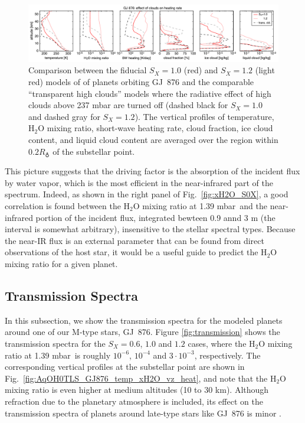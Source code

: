\documentclass[11pt,numberedappendix,twocolappendix,]{emulateapj}
\def\water{H$_2$O }
\def\preslevel{1.39 mbar\ }
\begin{document}
\begin{figure}[htb]
    \begin{center}
    \includegraphics[width=1\hsize]{fig/GJ876_heat_cld.pdf}
    \end{center}
\caption{Comparison between the fiducial $S_X=1.0$ (red) and $S_X=1.2$ (light red) models of of planets orbiting GJ~876 and the comparable ``transparent high clouds'' models where the radiative effect of high clouds above 237 mbar are turned off (dashed black for $S_X=1.0$ and dashed gray for $S_X=1.2$). The vertical profiles of temperature, \water mixing ratio, short-wave heating rate, cloud fraction, ice cloud content, and liquid cloud content are averaged over the region within $0.2R_\earth$ of the substellar point. }
\label{fig:GJ876_heat_cld}
\end{figure}

This picture suggests that the driving factor is the absorption of the incident flux by water vapor, which is the most efficient in the near-infrared part of the spectrum. 
Indeed, as shown in the right panel of Fig.~\ref{fig:xH2O_S0X}, a good correlation is found between the \water mixing ratio at \preslevel and the near-infrared portion of the incident flux, integrated bewteen 0.9 annd 3 \textmu m (the interval is somewhat arbitrary), insensitive to the stellar spectral types. 
Because the near-IR flux is an external parameter that can be found from direct observations of the host star, it would be a useful guide to predict the \water mixing ratio for a given planet. 


\subsection{Transmission Spectra}
\label{ss:result_TransmissionSpectra}

In this subsection, we show the transmission spectra for the modeled planets around one of our M-type stars, GJ~876. 
Figure \ref{fig:transmission} shows the transmission spectra for the $S_X=0.6$, $1.0$ and $1.2$ cases, where the \water mixing ratio at \preslevel is roughly $10^{-6}$, $10^{-4}$ and $3\cdot 10^{-3}$, respectively. 
The corresponding vertical profiles at the substellar point are shown in Fig.~\ref{fig:AqOH0TLS_GJ876_temp_xH2O_vz_heat}, and note that the \water mixing ratio is even higher at medium altitudes (10 to 30 km).
Although refraction due to the planetary atmosphere is included, its effect on the transmission spectra of planets around late-type stars like GJ~876 is minor \citep{Betremieux2014,Misra2014}. 
\end{document}
